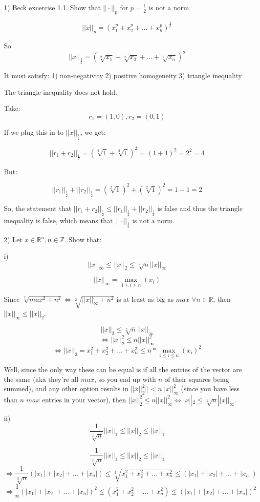 \documentclass{article}
\begin{document}
1) Beck excercise 1.1. Show that $||\cdot||_p$ for $p=\frac{1}{2}$ is not a norm.

\[||x||_p = (x_1^p + x_2^p + ... + x_n^p)^{\frac{1}{p}}\]

So
\[||x||_\frac{1}{2} = (\sqrt[2]{x_1} + \sqrt[2]{x_2} + ... + \sqrt[2]{x_n})^2\]

It must satisfy:
1) non-negativity
2) positive homogeneity
3) triangle inequality


The triangle inequality does not hold.

Take:
\[r_1 = (1, 0), r_2 = (0, 1)\]

If we plug this in to $||x||_\frac{1}{2}$, we get:

\[||r_1 + r_2||_\frac{1}{2} = (\sqrt[2]{1} + \sqrt[2]{1})^2 = (1 + 1)^2 = 2^2 = 4\]

But:

\[||r_1||_\frac{1}{2} + ||r_2||_\frac{1}{2}
= (\sqrt[2]{1})^2 + (\sqrt[2]{1})^2 = 1 + 1 = 2\]


So, the statement that $||r_1 + r_2||_\frac{1}{2}
\leq ||r_1||_\frac{1}{2} + ||r_2||_\frac{1}{2}$ is false
and thus the triangle inequality is false, which means that
$||\cdot||_\frac{1}{2}$ is not a norm.



2) Let $x \in \mathbb{R}^n, n \in \mathbb{Z}$. Show that:

\indent \indent i)
\[||x||_\infty \leq ||x||_2 \leq \sqrt[2]{n}||x||_\infty\]

\[||x||_\infty = \max\limits_{1 \leq i \leq n} (x_i)\]

Since $\sqrt[2]{max^2+n^2} \iff  \sqrt[2]{||x||_\infty+n^2}$
is at least as big as $max$ $\forall n \in \mathbb{R}$,
then $||x||_\infty \leq ||x||_2$.


\[||x||_2 \leq \sqrt[2]{n}||x||_\infty\]
\[\iff ||x||^2_2 \leq n||x||^2_\infty\]
\[\iff ||x||_2 = x_1^2 + x_2^2 + ... + x_n^2
\leq n*\max\limits_{1\leq i \leq n} (x_i)^2\]

Well, since the only way these can be equal is if all
the entries of the vector are the same
(aka they're all $max$, so you end up with $n$ of their squares being summed),
and any other option results in $||x||^2_2|| < n||x||^2_\infty$
(since you have less than $n$ $max$ entries in your vector),
then $||x||^2_2 \leq n||x||^2_\infty \iff |x||_2 \leq \sqrt[2]{n}||x||_\infty$.


\indent \indent ii)
\[\frac{1}{\sqrt[2]{n}}||x||_1 \leq ||x||_2 \leq ||x||_1\]

\[\frac{1}{\sqrt[2]{n}}||x||_1 \leq ||x||_2 \leq ||x||_1\]
\[\iff \frac{1}{\sqrt[2]{n}}(|x_1| + |x_2| + ... + |x_n|)
\leq \sqrt[2]{x_1^2 + x_2^2 + ... + x_n^2}
\leq (|x_1| + |x_2| + ... + |x_n|)\]
\[\iff \frac{1}{n}(|x_1| + |x_2| + ... + |x_n|)^2
\leq (x_1^2 + x_2^2 + ... + x_n^2)
\leq (|x_1| + |x_2| + ... + |x_n|)^2\]
\end{document}
